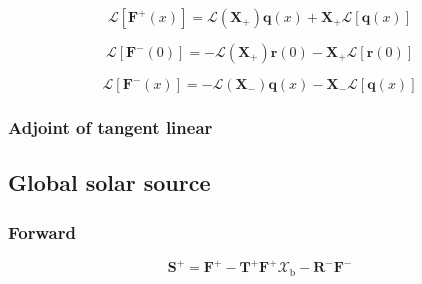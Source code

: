 \begin{equation}
\mathcal{L}\left[\mathbf{F}^{+}(x)\right] = \mathcal{L}(\mathbf{X}_{+})\mathbf{q}(x) + \mathbf{X}_{+}\mathcal{L}\left[\mathbf{q}(x)\right]
\label{eq:solar_source-local_solar_source-greens_function_forward-F_p_x_l}
\end{equation}

\begin{equation}
\mathcal{L}\left[\mathbf{F}^{-}(0)\right] = -\mathcal{L}(\mathbf{X}_{+})\mathbf{r}(0) - \mathbf{X}_{+}\mathcal{L}\left[\mathbf{r}(0)\right]
\label{eq:solar_source-local_solar_source-greens_function_forward-F_m_0_l}
\end{equation}

\begin{equation}
\mathcal{L}\left[\mathbf{F}^{-}(x)\right] = -\mathcal{L}(\mathbf{X}_{-})\mathbf{q}(x) - \mathbf{X}_{-}\mathcal{L}\left[\mathbf{q}(x)\right]
\label{eq:solar_source-local_solar_source-greens_function_forward-F_m_x_l}
\end{equation}


%
\subsubsection{Adjoint of tangent linear}
\label{sec:solar_source-local_solar_source-greens_function_adjoint_of_tangent_linear}


%
\subsection{Global solar source}
\label{sec:solar_source-global_solar_source}


\subsubsection{Forward}
\label{sec:solar_source-global_solar_source-forward}


\begin{equation}
\mathbf{S}^{+} = \mathbf{F}^{+} - \mathbf{T}^{+}\mathbf{F}^{+}\mathcal{X}_{\mathrm{b}} - \mathbf{R}^{-}\mathbf{F}^{-}
\label{eq:solar_source-global_solar_source-forward-S_p}
\end{equation}

